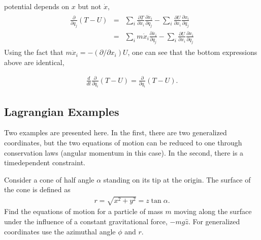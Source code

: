 \documentclass[letterpaper,10pt,english]{sphinxmanual}
\begin{document}
potential depends on \(x\) but not \(\dot{x}\),
\begin{equation*}
\begin{split}
\begin{eqnarray}
\frac{\partial}{\partial q_j}(T-U)&=&\sum_i\frac{\partial T}{\partial\dot{x}_i}\frac{\partial\dot{x_i}}{\partial q_j}
-\sum_i\frac{\partial U}{\partial x_i}\frac{\partial x_i}{\partial q_j}\\
\nonumber
&=&\sum_i m\dot{x}_i\frac{\partial\dot{x_i}}{\partial q_j}
-\sum_i\frac{\partial U}{\partial x_i}\frac{\partial x_i}{\partial q_j}
\end{eqnarray}
\end{split}
\end{equation*}
Using the fact that \(m\ddot{x}_i=-(\partial/\partial x_i)U\), one can
see that the bottom expressions above are identical,




\begin{equation*}
\begin{split}
\begin{equation}
\frac{d}{dt}\frac{\partial}{\partial\dot{q}_i}(T-U)=\frac{\partial}{\partial q_i}(T-U).
\label{_auto99} \tag{135}
\end{equation}
\end{split}
\end{equation*}

\subsection{Lagrangian Examples}
\label{\detokenize{chapter1:lagrangian-examples}}
Two examples are presented here. In the first, there are two
generalized coordinates, but the two equations of motion can be
reduced to one through conservation laws (angular momentum in this
case). In the second, there is a time\sphinxhyphen{}dependent constraint.

Consider a cone of half angle \(\alpha\) standing on its tip at the
origin. The surface of the cone is defined as
\begin{equation*}
\begin{split}
r=\sqrt{x^2+y^2}=z\tan \alpha.
\end{split}
\end{equation*}
Find the equations of motion for a particle of mass \(m\) moving along the surface under the influence of a constant gravitational force, \(-mg\hat{z}\). For generalized coordinates use the azimuthal angle \(\phi\) and \(r\).
\end{document}
